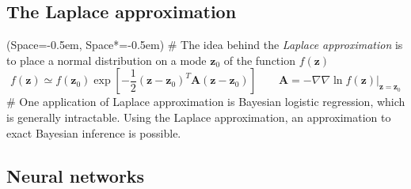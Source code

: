 \documentclass[12pt, a4paper]{article}
\newcommand{\listSpace}{-0.5em}%
\newcommand{\vect}[1]{\bm{#1}}
\begin{document}
\subsection*{The Laplace approximation}
\begin{easylist}[itemize]
	\ListProperties(Space=\listSpace, Space*=\listSpace)
	# The idea behind the \emph{Laplace approximation} is to place a normal distribution on a mode $\vect{z}_0$ of the function $f(\vect{z})$
	\begin{equation*}
		f(\vect{z}) \simeq f(\vect{z}_0) \exp \left[ 
		- \frac{1}{2}
		(\vect{z} - \vect{z}_0)^T \vect{A}
		(\vect{z} - \vect{z}_0)
		 \right]
		 \qquad
		 \vect{A} = \left. - \nabla \nabla \ln f(\vect{z}) \right|_{\vect{z} = \vect{z}_0}
	\end{equation*}
	# One application of Laplace approximation is Bayesian logistic regression, which is generally intractable.
	Using the Laplace approximation, an approximation to exact Bayesian inference is possible.
\end{easylist}

\subsection{Neural networks}
\end{document}
